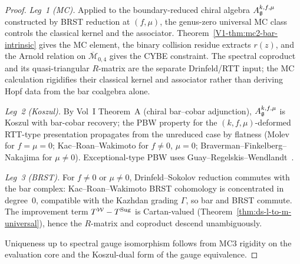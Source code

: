 \begin{proof}
\emph{Leg~1 (MC).} Applied to the boundary-reduced chiral algebra
$A_{\mathfrak{g}}^{k,f,\mu}$ constructed by BRST reduction at $(f,\mu)$, the
genus-zero universal MC class controls the classical kernel and the
associator. Theorem~\ref*{V1-thm:mc2-bar-intrinsic} gives the MC
element, the binary collision residue extracts $r(z)$, and the Arnold
relation on $\overline{\mathcal{M}}_{0,4}$ gives the CYBE constraint.
The spectral coproduct and its quasi-triangular $R$-matrix are the
separate Drinfeld/RTT input; the MC calculation rigidifies their
classical kernel and associator rather than deriving Hopf data from
the bar coalgebra alone.

\emph{Leg~2 (Koszul).} By Vol~I Theorem~A (chiral bar--cobar
adjunction), $A_{\mathfrak{g}}^{k,f,\mu}$ is Koszul with bar-cobar recovery; the
PBW property for the $(k,f,\mu)$-deformed RTT-type presentation
propagates from the unreduced case by flatness (Molev for $f=\mu=0$;
Kac--Roan--Wakimoto for $f\ne 0$, $\mu=0$;
Braverman--Finkelberg--Nakajima for $\mu\ne 0$). Exceptional-type PBW
uses Guay--Regelskis--Wendlandt~\cite{GRW18}.

\emph{Leg~3 (BRST).} For $f\ne 0$ or $\mu\ne 0$, Drinfeld--Sokolov
reduction commutes with the bar complex: Kac--Roan--Wakimoto BRST
cohomology is concentrated in degree~$0$, compatible with the
Kazhdan grading $\Gamma$, so bar and BRST commute. The improvement
term $T^{\mathcal{W}}-T^{\mathrm{Sug}}$ is Cartan-valued
(Theorem~\ref{thm:ds-l-to-m-universal}), hence the $R$-matrix and
coproduct descend unambiguously.

Uniqueness up to spectral gauge isomorphism follows from MC3
rigidity on the evaluation core and the Koszul-dual form of the
gauge equivalence.
\end{proof}

